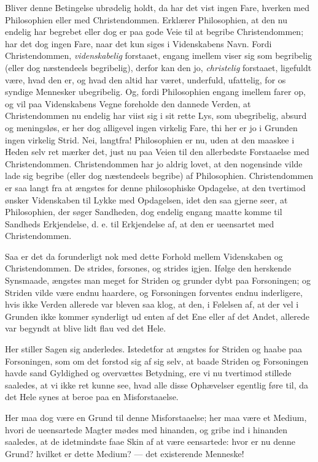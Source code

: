 \documentclass[12pt,a4paper]{book}
\newcommand{\opage}[1]{\marginnote{\footnotesize\textit{[#1]}}}
\begin{document}
Bliver denne Betingelse ubrødelig holdt, da har det vist ingen Fare,
hverken med Philosophien eller med Christendommen. Erklærer Philosophien,
at den nu endelig har begrebet eller dog er paa gode Veie til at begribe
Christendommen; har det dog ingen Fare, naar det kun siges i
Videnskabens Navn. Fordi Christendommen, \emph{videnskabelig} forstaaet,
engang imellem viser sig som begribelig (eller dog næstendeels
begribelig), derfor kan den jo, \emph{christelig} forstaaet, ligefuldt
være, hvad den er, og hvad den altid har været, underfuld, ufattelig, for
os syndige Mennesker ubegribelig. Og, fordi Philosophien engang imellem
farer op, og vil paa Videnskabens Vegne foreholde den dannede Verden, at
Christendommen nu endelig har viist sig i sit rette Lys, som ubegribelig,
absurd og meningsløs, er her dog alligevel ingen virkelig Fare, thi her
er jo i Grunden ingen virkelig Strid. Nei, langtfra! Philosophien er nu,
uden at den maaskee i Heden selv ret mærker det, just nu paa Veien til
den allerbedste Forstaaelse med Christendommen. Christendommen har jo
aldrig lovet, at den nogensinde vilde lade sig begribe (eller dog
næstendeels begribe) af Philosophien. Christendommen er saa langt fra at
ængstes for denne philosophiske Opdagelse, at den tvertimod ønsker
Videnskaben til Lykke med Opdagelsen, idet den saa gjerne seer, at
Philosophien, der søger Sandheden, dog endelig engang maatte komme til
Sandheds Erkjendelse, d. e. til Erkjendelse af, at den er ueensartet med
Christendommen.

Saa er det da forunderligt nok med dette Forhold mellem Videnskaben og
Christendommen. De strides, forsones,
\opage{7} og strides igjen. Ifølge den herskende Synsmaade, ængstes man meget for
Striden og grunder dybt paa Forsoningen; og Striden vilde være endnu
haardere, og Forsoningen forventes endnu inderligere, hvis ikke Verden
allerede var bleven saa klog, at den, i Følelsen af, at der vel i Grunden
ikke kommer synderligt ud enten af det Ene eller af det Andet, allerede
var begyndt at blive lidt flau ved det Hele.

Her stiller Sagen sig anderledes. Istedetfor at ængstes for Striden og
haabe paa Forsoningen, som om det forstod sig af sig selv, at baade
Striden og Forsoningen havde sand Gyldighed og overvættes Betydning, ere
vi nu tvertimod stillede saaledes, at vi ikke ret kunne see, hvad alle
disse Ophævelser egentlig føre til, da det Hele synes at beroe paa en
Misforstaaelse.

Her maa dog være en Grund til denne Misforstaaelse; her maa være et
Medium, hvori de ueensartede Magter mødes med hinanden, og gribe ind i
hinanden saaledes, at de idetmindste faae Skin af at være eensartede:
hvor er nu denne Grund? hvilket er dette Medium? --- det existerende
Menneske!
\end{document}
